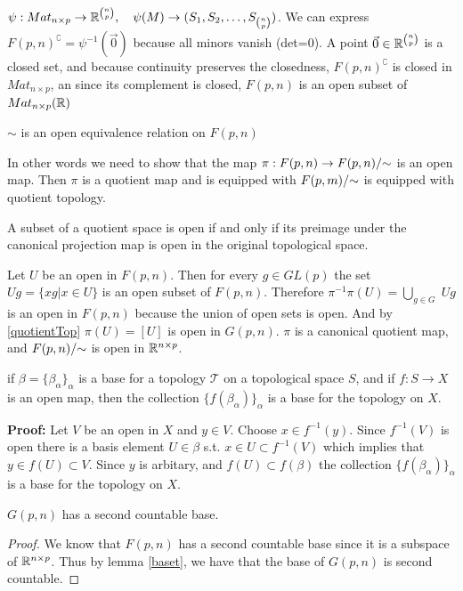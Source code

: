 \documentclass[11pt,a4paper]{report}
\begin{document}
$ \psi: Mat_{n \times p} \to \mathbb{R}^{ n \choose p}, \quad \psi(M) \to (S_1,S_2, \dots, S_{n \choose p})$.
We can express $F(p,n)^\complement = \psi ^{-1} ( \vec{0} )$ because all minors vanish (det=0).
A point $ \vec{0} \in \mathbb{R}^{n \choose p}$ is a closed set, and because continuity preserves the closedness, $F(p,n)^\complement$ is closed in $Mat_{n \times p}$,
an since its complement is closed, $F(p,n)$ is an open subset of $Mat_{n \times p}(\mathbb{R})$
\begin{Prop}
    $\sim$ is an open equivalence relation on $F(p,n)$
\end{Prop}
In other words we need to show that the map $\pi: F(p,n) \to F(p,n)/{\sim}$ is an open map.
Then $\pi$ is a quotient map and is equipped with $F(p,m)/{\sim}$ is equipped with quotient topology.
\newline
\begin{Lemma} \label{quotientTop}
    A subset of a quotient space is open if and only if its
    preimage under the canonical projection map is open in the original topological space.
\end{Lemma}
Let $U$ be an open in $F(p,n)$. Then for every $g \in GL(p)$ the set $U g = \{ x g | x \in U \}$ is an open subset of $F(p,n)$.
Therefore $\pi^{-1}\pi(U) = \displaystyle \bigcup_{g \in G} \; U g$ is an open in $F(p,n)$ because the union of open sets is open.
And by \ref{quotientTop} $\pi(U) = [U]$ is open in $G(p,n)$. $\pi$ is a canonical quotient map, and $F(p,n)/{\sim}$ is open in $\mathbb{R}^{n \times p}$. 
\begin{Lemma}
    \label{baset}
    if $\beta = \{ \beta_\alpha \}_\alpha$ is a base for a topology $\mathcal{T}$ on a topological space $S$,
    and if $f: S \to X$ is an open map, then the collection $\{ f (\beta_\alpha) \}_\alpha$ is a base for the topology on $X$.
\end{Lemma}
\textbf{Proof:} Let $V$ be an open in $X$ and $y \in V$. Choose $x \in f^{-1}(y)$. 
Since $f^{-1} (V)$ is open there is a basis element $U \in \beta$ s.t. $x \in U \subset f^{-1}(V)$
which implies that $y \in f(U) \subset V$. Since $y$ is arbitary, and $f(U) \subset f(\beta)$ the collection $\{ f (\beta_\alpha) \}_\alpha$ is a base for the topology on $X$.
\newline
\newline
\begin{Prop}\label{secondCount}
    $G(p,n)$ has a second countable base.
\end{Prop}
\begin{proof}
We know that $F(p,n)$ has a second countable base since it is a subspace of $\mathbb{R}^{n \times p}$.
Thus by lemma \ref{baset}, we have that the base of $G(p,n)$ is second countable.
\end{proof}
\end{document}
